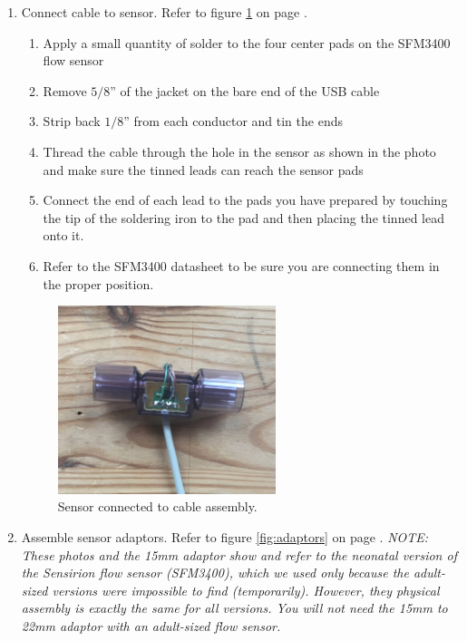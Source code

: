 \documentclass[11pt, letterpaper]{article}
\begin{document}
\begin{enumerate}
\begin{enumerate}[label=4.\arabic*]
\item
Connect cable to sensor.  Refer to figure \ref{fig:flow_sensor} on page \pageref{fig:flow_sensor}.

\begin{enumerate}[label=4.2.\arabic*]
\item
Apply a small quantity of solder to the four center pads on the SFM3400 flow sensor
\item
Remove $5/8$'' of the jacket on the bare end of the USB cable
\item
Strip back $1/8$'' from each conductor and tin the ends
\item
Thread the cable through the hole in the sensor as shown in the photo and make sure the tinned leads can reach the sensor pads
\item
Connect the end of each lead to the pads you have prepared by touching the tip of the soldering iron to the pad and then placing the tinned lead onto it.
\item
Refer to the SFM3400 datasheet to be sure you are connecting them in the proper position.
\end{enumerate}
\begin{figure}[H]
\label{fig:flow_sensor}
\centering
\includegraphics[width=0.6\textwidth]{flow_cable.JPG}
\caption{Sensor connected to cable assembly.}
\end{figure}

\item
  Assemble sensor adaptors. Refer to figure \ref{fig:adaptors} on page \pageref{fig:adaptors}.
  {\em NOTE: These photos and the 15mm adaptor show and refer to the neonatal version of the Sensirion flow sensor (SFM3400),
    which we used only because the adult-sized versions were impossible to find (temporarily). However, they physical
    assembly is exactly the same for all versions. You will not need the 15mm to 22mm adaptor with an adult-sized flow sensor.}


\end{enumerate}
\end{enumerate}
\end{document}

